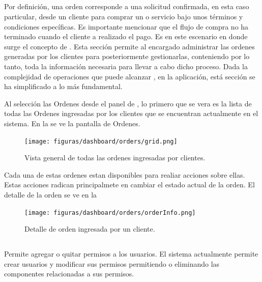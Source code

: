 \subsection{\ordersEF}

	Por definición, una orden corresponde a una solicitud confirmada, en esta caso particular, desde un cliente para comprar un \itemCOM o servicio bajo unos términos y condiciones específicas. Es importante mencionar que el flujo de compra no ha terminado cuando el cliente a realizado el pago. Es en este escenario en donde surge el concepto de \orderFulfillmentCOM.
	Esta sección permite al encargado administrar las ordenes generadas por los clientes para posteriormente gestionarlas, conteniendo por lo tanto, toda la información necesaria para llevar a cabo dicho proceso.
	Dada la complejidad de operaciones que puede alcanzar \orderFulfillmentCOM, en la aplicación, está sección se ha simplificado a lo más fundamental.

	Al selección las Ordenes desde el panel de \dashboardEF, lo primero que se vera es la lista de todas las Ordenes ingresadas por los clientes que se encuentran actualmente en el sistema. En la  se ve la pantalla de Ordenes.


	\begin{figure}[H]
		\centering
		\texttt{[image: figuras/dashboard/orders/grid.png]}
		\caption{Vista general de todas las ordenes ingresadas por clientes.}
		\label{figure:dashboard:orders:grid}
	\end{figure}

	Cada una de estas ordenes estan disponibles para realiar acciones sobre ellas. Estas acciones radican principalmete en cambiar el estado actual de la orden. El detalle de la orden se ve en la 
	\begin{figure}[H]
		\centering
		\texttt{[image: figuras/dashboard/orders/orderInfo.png]}
		\caption{Detalle de orden ingresada por un cliente.}
		\label{figure:dashboard:orders:orderInfo}
	\end{figure}


\subsection{\accountsEF}

	Permite agregar o quitar permisos a los usuarios. El sistema actualmente permite crear usuarios y modificar sus permisos permitiendo o eliminando las componentes relacionadas a sus permisos.

